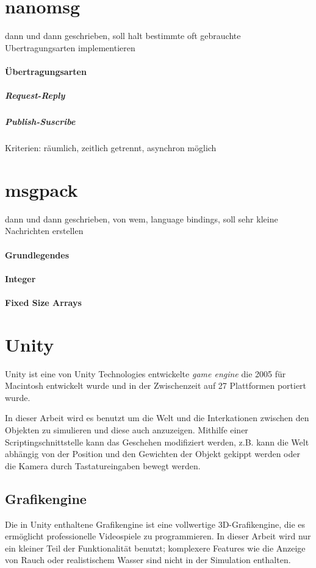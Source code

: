 \documentclass[
    12pt,
    bibliography=totoc,
    ngerman
]{scrartcl}
\begin{document}
\section{nanomsg}
dann und dann geschrieben, soll halt bestimmte oft gebrauchte Ubertragungsarten implementieren

\paragraph{{\"{U}}bertragungsarten}
\subparagraph{Request-Reply}
\subparagraph{Publish-Suscribe}
Kriterien: r{\"{a}}umlich, zeitlich getrennt, asynchron m{\"{o}}glich \cite{pubsub}

\clearpage
\section{msgpack}
dann und dann geschrieben, von wem, language bindings, soll sehr kleine Nachrichten erstellen

\paragraph{Grundlegendes}
\paragraph{Integer}
\paragraph{Fixed Size Arrays}


\clearpage
\section{Unity}
Unity ist eine von Unity Technologies entwickelte \textit{game engine} die 2005 f{\"{u}}r Macintosh entwickelt wurde und in der Zwischenzeit auf 27 Plattformen portiert wurde.

In dieser Arbeit wird es benutzt um die Welt und die Interkationen zwischen den Objekten zu simulieren und diese auch anzuzeigen. Mithilfe einer Scriptingschnittstelle kann das Geschehen modifiziert werden, z.B. kann die Welt
abh{\"{a}}ngig von der Position und den Gewichten der Objekt gekippt werden oder die Kamera durch Tastatureingaben bewegt werden.

\subsection{Grafikengine}
Die in Unity enthaltene Grafikengine ist eine vollwertige 3D-Grafikengine, die es erm{\"{o}}glicht professionelle Videospiele zu programmieren. In dieser Arbeit wird nur
ein kleiner Teil der Funktionalit{\"{a}}t benutzt; komplexere Features wie die Anzeige von Rauch oder realistischem Wasser sind nicht in der Simulation enthalten.
\end{document}
